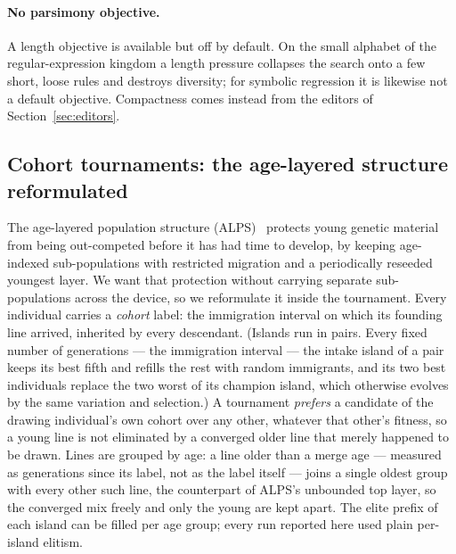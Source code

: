 \documentclass[sigconf,nonacm]{acmart}
\begin{document}
\paragraph{No parsimony objective.} A length objective is available but off by
default. On the small alphabet of the regular-expression kingdom a length
pressure collapses the search onto a few short, loose rules and destroys
diversity; for symbolic regression it is likewise not a default objective.
Compactness comes instead from the editors of Section~\ref{sec:editors}.

\subsection{Cohort tournaments: the age-layered structure reformulated}

The age-layered population structure (ALPS)~\cite{hornby2006alps} protects young
genetic material from being out-competed before it has had time to develop, by
keeping age-indexed sub-populations with restricted migration and a periodically
reseeded youngest layer. We want that protection without carrying separate
sub-populations across the device, so we reformulate it inside the tournament.
Every individual carries a \emph{cohort} label: the immigration interval on
which its founding line arrived, inherited by every descendant. (Islands run in
pairs. Every fixed number of generations --- the immigration interval --- the
intake island of a pair keeps its best fifth and refills the rest with random
immigrants, and its two best individuals replace the two worst of its champion
island, which otherwise evolves by the same variation and selection.) A tournament
\emph{prefers} a candidate of the drawing individual's own cohort over any other,
whatever that other's fitness, so a young line is not eliminated by a converged
older line that merely happened to be drawn. Lines are grouped by age: a line
older than a merge age --- measured as generations since its label, not as the
label itself --- joins a single oldest group with every other such line, the
counterpart of ALPS's unbounded top layer, so the converged mix freely and only
the young are kept apart. The elite prefix of each island can be filled per age
group; every run reported here used plain per-island elitism.
\end{document}
